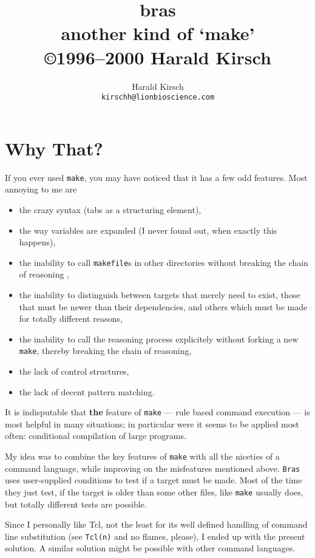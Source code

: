\documentclass[11pt]{scrartcl}
\title{bras\\
another kind of `make'\\[2mm]
\small \copyright 1996--2000 Harald Kirsch}
\author{\relax
Harald Kirsch\\
\texttt{kirschh@lionbioscience.com}}
\newcommand{\Bras}{\texttt{Bras}}
\newcommand{\make}{\texttt{make}}
\newcommand{\makefile}{\texttt{makefile}}
\begin{document}
\maketitle

\tableofcontents
\clearpage


\section{Why That?}
If you ever used \texttt{make}, you may have noticed that it has a few
odd features. Most annoying to me are

\begin{itemize}
\item 
the crazy syntax (tabs as a structuring element),
\item 
the way variables are expanded (I never found out, when exactly
this happens),
\item 
the inability to call \makefile{}s in other directories without
breaking the chain of reasoning \cite{Mil97},
\item the inability to distinguish between targets that merely need to
  exist, those that must be newer than their dependencies, and others
  which must be made for totally different reasons,
\item the inability to call the reasoning process explicitely without
  forking a new \make, thereby breaking the chain of reasoning,
\item the lack of control structures,
\item the lack of decent pattern matching.
\end{itemize}

It is indisputable that \textbf{the} feature of \texttt{make} ---
rule based command execution --- is most helpful in many situations;
in particular were it seems to be applied most often:
conditional compilation of large programs.

My idea was to combine the key features of \texttt{make} with all the
niceties of a command language, while improving on the misfeatures
mentioned above. \Bras{} uses user-supplied conditions to test if a
target must be made. Most of the time they just test, if the target is
older than some other files, like \make{} usually does, but totally
different tests are possible.

Since I personally like Tcl, not the least for its well defined
handling of command line substitution (see \texttt{Tcl(n)} and no
flames, please), I ended up with the present solution. A similar
solution might be possible with other command languages.
\end{document}
